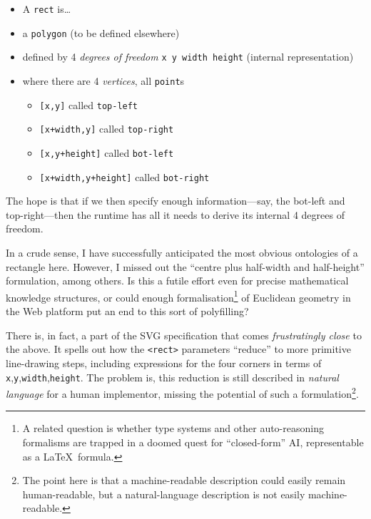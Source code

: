 \begin{itemize}
\tightlist
\item
  A \texttt{rect} is\ldots{}
\item
  a \texttt{polygon} (to be defined elsewhere)
\item
  defined by 4 \emph{degrees of freedom} \texttt{x\ y\ width\ height}
  (internal representation)
\item
  where there are 4 \emph{vertices}, all \texttt{point}s

  \begin{itemize}
  \tightlist
  \item
    \texttt{{[}x,y{]}} called \texttt{top-left}
  \item
    \texttt{{[}x+width,y{]}} called \texttt{top-right}
  \item
    \texttt{{[}x,y+height{]}} called \texttt{bot-left}
  \item
    \texttt{{[}x+width,y+height{]}} called \texttt{bot-right}
  \end{itemize}
\end{itemize}

The hope is that if we then specify enough information---say, the
bot-left and top-right---then the runtime has all it needs to derive its
internal 4 degrees of freedom.

In a crude sense, I have successfully anticipated the most obvious
ontologies of a rectangle here. However, I missed out the ``centre plus
half-width and half-height'' formulation, among others. Is this a futile
effort even for precise mathematical knowledge structures, or could
enough formalisation\footnote{A related question is whether type systems
  and other auto-reasoning formalisms are trapped in a doomed quest for
  ``closed-form'' AI, representable as a \LaTeX~formula.} of Euclidean
geometry in the Web platform put an end to this sort of polyfilling?

There is, in fact, a part of the SVG specification \cite{svg-rect} that
comes \emph{frustratingly close} to the above. It spells out how the
\texttt{\textless{}rect\textgreater{}} parameters ``reduce'' to more
primitive line-drawing steps, including expressions for the four corners
in terms of \texttt{x},\texttt{y},\texttt{width},\texttt{height}{}. The
problem is, this reduction is still described in \emph{natural language}
for a human implementor, missing the potential of such a
formulation\footnote{The point here is that a machine-readable
  description could easily remain human-readable, but a natural-language
  description is not easily machine-readable.}.

